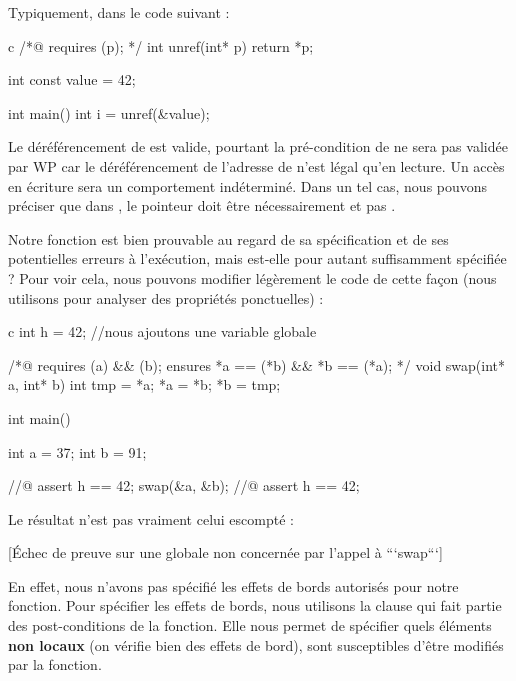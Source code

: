 Typiquement, dans le code suivant :



\begin{CodeBlock}{c}
/*@ requires \valid(p); */
int unref(int* p){
  return *p;
}

int const value = 42;

int main(){
  int i = unref(&value);
}
\end{CodeBlock}



Le déréférencement de  est valide, pourtant la pré-condition de 
ne sera pas validée par WP car le déréférencement de l'adresse de  
n'est légal qu'en lecture. Un accès en écriture sera un comportement 
indéterminé. Dans un tel cas, nous pouvons préciser que dans , le 
pointeur  doit être nécessairement  et pas .





Notre fonction  est bien prouvable au regard de sa spécification et
de ses potentielles erreurs à l'exécution, mais est-elle pour autant 
suffisamment spécifiée ? Pour voir cela, nous pouvons modifier légèrement le code
de cette façon (nous utilisons  pour analyser des propriétés 
ponctuelles) :



\begin{CodeBlock}{c}
int h = 42; //nous ajoutons une variable globale

/*@
  requires \valid(a) && \valid(b);
  ensures  *a == \old(*b) && *b == \old(*a);
*/
void swap(int* a, int* b){
  int tmp = *a;
  *a = *b;
  *b = tmp;
}

int main(){
  int a = 37;
  int b = 91;

  //@ assert h == 42;
  swap(&a, &b);
  //@ assert h == 42;
}
\end{CodeBlock}



Le résultat n'est pas vraiment celui escompté :



[Échec de preuve sur une globale non concernée par l'appel à ```swap```]


En effet, nous n'avons pas spécifié les effets de bords autorisés pour notre
fonction. Pour spécifier les effets de bords, nous utilisons la clause 
qui fait partie des post-conditions de la fonction. Elle nous permet de spécifier 
quels éléments \textbf{non locaux} (on vérifie bien des effets de bord), sont 
susceptibles d'être modifiés par la fonction.



